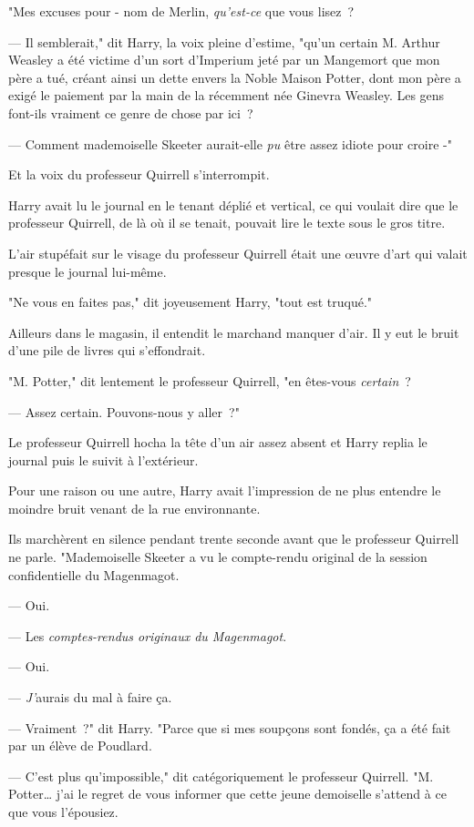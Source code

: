 "Mes excuses pour - nom de Merlin, \emph{qu'est-ce} que vous lisez~?

--- Il semblerait," dit Harry, la voix pleine d'estime, "qu'un certain M. Arthur Weasley a été victime d'un sort d'Imperium jeté par un Mangemort que mon père a tué, créant ainsi un dette envers la Noble Maison Potter, dont mon père a exigé le paiement par la main de la récemment née Ginevra Weasley. Les gens font-ils vraiment ce genre de chose par ici~?

--- Comment mademoiselle Skeeter aurait-elle \emph{pu} être assez idiote pour croire -"

Et la voix du professeur Quirrell s'interrompit.

Harry avait lu le journal en le tenant déplié et vertical, ce qui voulait dire que le professeur Quirrell, de là où il se tenait, pouvait lire le texte sous le gros titre.

L'air stupéfait sur le visage du professeur Quirrell était une œuvre d'art qui valait presque le journal lui-même.

"Ne vous en faites pas," dit joyeusement Harry, "tout est truqué."

Ailleurs dans le magasin, il entendit le marchand manquer d'air. Il y eut le bruit d'une pile de livres qui s'effondrait.

"M. Potter," dit lentement le professeur Quirrell, "en êtes-vous \emph{certain}~?

--- Assez certain. Pouvons-nous y aller~?"

Le professeur Quirrell hocha la tête d'un air assez absent et Harry replia le journal puis le suivit à l'extérieur.

Pour une raison ou une autre, Harry avait l'impression de ne plus entendre le moindre bruit venant de la rue environnante.

Ils marchèrent en silence pendant trente seconde avant que le professeur Quirrell ne parle. "Mademoiselle Skeeter a vu le compte-rendu original de la session confidentielle du Magenmagot.

--- Oui.

--- Les \emph{comptes-rendus originaux du Magenmagot}.

--- Oui.

--- \emph{J'}aurais du mal à faire ça.

--- Vraiment~?" dit Harry. "Parce que si mes soupçons sont fondés, ça a été fait par un élève de Poudlard.

--- C'est plus qu'impossible," dit catégoriquement le professeur Quirrell. "M. Potter… j'ai le regret de vous informer que cette jeune demoiselle s'attend à ce que vous l'épousiez.

